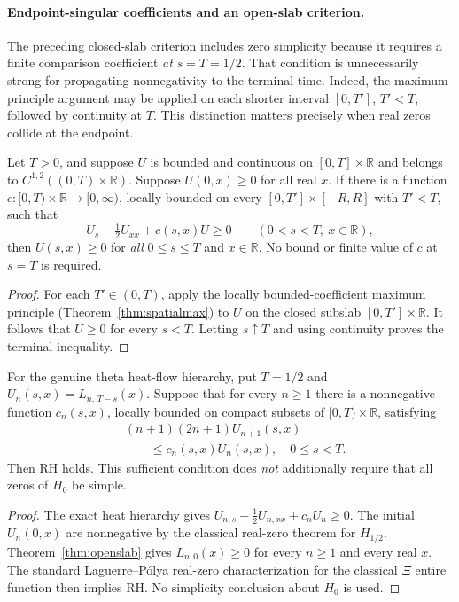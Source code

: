\paragraph{Endpoint-singular coefficients and an open-slab criterion.}
\label{par:openslab}
The preceding closed-slab criterion includes zero simplicity
because it requires a finite comparison coefficient \emph{at}
$s=T=1/2$. That condition is unnecessarily strong for
propagating nonnegativity to the terminal time.
Indeed, the maximum-principle argument may be applied
on each shorter interval $[0,T']$, $T'<T$, followed by
continuity at $T$. This distinction matters precisely
when real zeros collide at the endpoint.

\begin{theorem}\label{thm:openslab}
Let $T>0$, and suppose $U$ is bounded and continuous
on $[0,T]\times\mathbb R$ and belongs to
$C^{1,2}((0,T)\times\mathbb R)$.
Suppose $U(0,x)\ge0$ for all real $x$.
If there is a function
$c:[0,T)\times\mathbb R\to[0,\infty)$,
locally bounded on every
$[0,T']\times[-R,R]$ with $T'<T$,
such that
\begin{equation}\label{eq:openslabineq}
U_s-\tfrac12U_{xx}+c(s,x)U\ge0
\qquad(0<s<T,\ x\in\mathbb R),
\end{equation}
then $U(s,x)\ge0$ for \emph{all}
$0\le s\le T$ and $x\in\mathbb R$.
No bound or finite value of $c$ at $s=T$ is required.
\end{theorem}
\begin{proof}
For each $T'\in(0,T)$, apply the locally
bounded-coefficient maximum principle
(Theorem~\ref{thm:spatialmax}) to $U$
on the closed subslab $[0,T']\times\mathbb R$.
It follows that $U\ge0$ for every $s<T$.
Letting $s\uparrow T$ and using continuity
proves the terminal inequality.
\end{proof}

\begin{corollary}\label{cor:openslabRH}
For the genuine theta heat-flow hierarchy,
put $T=1/2$ and
$U_n(s,x)=L_{n,\,T-s}(x)$.
Suppose that for every $n\ge1$ there is
a nonnegative function $c_n(s,x)$,
locally bounded on compact subsets of
$[0,T)\times\mathbb R$, satisfying
\begin{equation}\label{eq:openslabrh}
\begin{aligned}
&(n+1)(2n+1)U_{n+1}(s,x)\\
&\qquad\le c_n(s,x)U_n(s,x),
\quad 0\le s<T.
\end{aligned}
\end{equation}
Then RH holds. This sufficient condition does
\emph{not} additionally require that all
zeros of $H_0$ be simple.
\end{corollary}
\begin{proof}
The exact heat hierarchy gives
$U_{n,s}-\tfrac12U_{n,xx}+c_nU_n\ge0$.
The initial $U_n(0,x)$ are nonnegative
by the classical real-zero theorem for $H_{1/2}$.
Theorem~\ref{thm:openslab}
gives $L_{n,0}(x)\ge0$ for every $n\ge1$
and every real $x$. The standard
Laguerre--P\'olya real-zero characterization
for the classical $\Xi$ entire function
then implies RH. No simplicity conclusion
about $H_0$ is used.
\end{proof}


